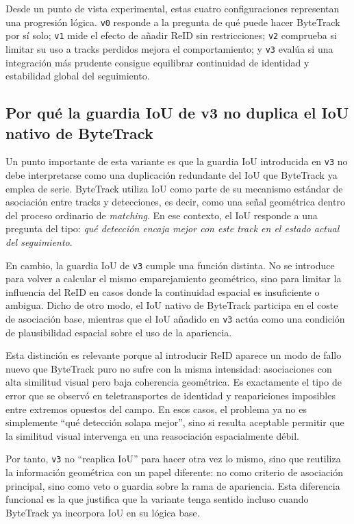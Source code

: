 \documentclass[../MAIN.tex]{subfiles}
\begin{document}
	Desde un punto de vista experimental, estas cuatro configuraciones representan una progresión lógica. \texttt{v0} responde a la pregunta de qué puede hacer ByteTrack por sí solo; \texttt{v1} mide el efecto de añadir ReID sin restricciones; \texttt{v2} comprueba si limitar su uso a tracks perdidos mejora el comportamiento; y \texttt{v3} evalúa si una integración más prudente consigue equilibrar continuidad de identidad y estabilidad global del seguimiento.
	
	\subsection{Por qué la guardia IoU de v3 no duplica el IoU nativo de ByteTrack}
	
	Un punto importante de esta variante es que la guardia IoU introducida en \texttt{v3} no debe interpretarse como una duplicación redundante del IoU que ByteTrack ya emplea de serie. ByteTrack utiliza IoU como parte de su mecanismo estándar de asociación entre tracks y detecciones, es decir, como una señal geométrica dentro del proceso ordinario de \textit{matching}. En ese contexto, el IoU responde a una pregunta del tipo: \emph{qué detección encaja mejor con este track en el estado actual del seguimiento}.
	
	En cambio, la guardia IoU de \texttt{v3} cumple una función distinta. No se introduce para volver a calcular el mismo emparejamiento geométrico, sino para limitar la influencia del ReID en casos donde la continuidad espacial es insuficiente o ambigua. Dicho de otro modo, el IoU nativo de ByteTrack participa en el coste de asociación base, mientras que el IoU añadido en \texttt{v3} actúa como una condición de plausibilidad espacial sobre el uso de la apariencia.
	
	Esta distinción es relevante porque al introducir ReID aparece un modo de fallo nuevo que ByteTrack puro no sufre con la misma intensidad: asociaciones con alta similitud visual pero baja coherencia geométrica. Es exactamente el tipo de error que se observó en teletransportes de identidad y reapariciones imposibles entre extremos opuestos del campo. En esos casos, el problema ya no es simplemente ``qué detección solapa mejor'', sino si resulta aceptable permitir que la similitud visual intervenga en una reasociación espacialmente débil.
	
	Por tanto, \texttt{v3} no ``reaplica IoU'' para hacer otra vez lo mismo, sino que reutiliza la información geométrica con un papel diferente: no como criterio de asociación principal, sino como veto o guardia sobre la rama de apariencia. Esta diferencia funcional es la que justifica que la variante tenga sentido incluso cuando ByteTrack ya incorpora IoU en su lógica base.
	
\end{document}
